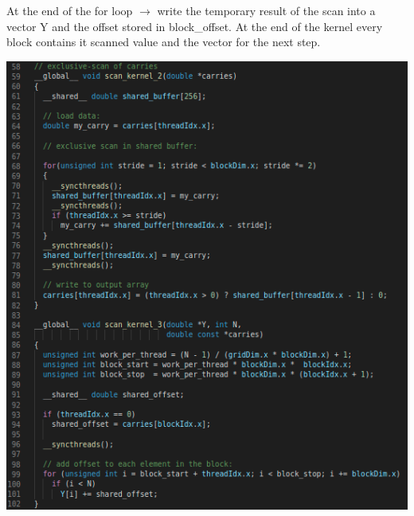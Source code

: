 \documentclass[11pt,a4paper]{article}
\begin{document}
At the end of the for loop $\rightarrow$ write the temporary result of the scan into a vector Y and the offset stored in block\_offset. At the end of the kernel every block contains it scanned value and the vector for the next step.
\begin{center}
	
	\begin{minipage}[t]{0.40\textwidth}
		\includegraphics[width=\textwidth]{Bilder/Ex5_1_2}
	\end{minipage}
	
\end{center}
\newpage 
	
\end{document}
